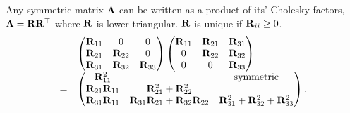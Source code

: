	
Any symmetric matrix ${\boldsymbol \Lambda}$ can be written as a product of its' Cholesky factors, ${\boldsymbol \Lambda} = {\bf R}
{\bf R}^\top$ where ${\bf R}$ is lower triangular. ${\bf R}$ is unique if ${\bf R}_{ii}
\geq 0$.
\begin{equation*}
\label{eq:cholesky_factorisation}
\begin{array}{lll}
	&\begin{pmatrix}
	{\bf R}_{11}          & 0                                    & 0                                     \\
	{\bf R}_{21}          & {\bf R}_{22}                             & 0                                     \\
	{\bf R}_{31}          & {\bf R}_{32}                             & {\bf R}_{33}                              
	\end{pmatrix}
	\begin{pmatrix}
	{\bf R}_{11}          & {\bf R}_{21}                             & {\bf R}_{31}                              \\
	0                 & {\bf R}_{22}                             & {\bf R}_{32}                              \\
	0                 & 0                                    & {\bf R}_{33}                              
	\end{pmatrix}
	\\
	=& \begin{pmatrix}
	{\bf R}_{11}^2        &                                      & \text{symmetric}                      \\
	{\bf R}_{21}{\bf R}_{11} & {\bf R}_{21}^2 + {\bf R}_{22}^2 \\
	{\bf R}_{31} {\bf R}_{11} & {\bf R}_{31}{\bf R}_{21} + {\bf R}_{32} {\bf R}_{22} & {\bf R}_{31}^2 + {\bf R}_{32} ^2 + {\bf R}_{33}^2 
	\end{pmatrix}.
\end{array}
\end{equation*}

